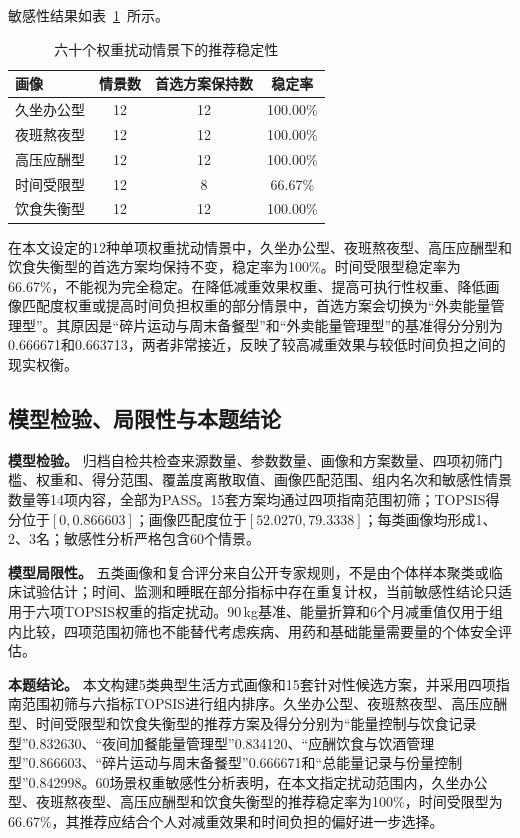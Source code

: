 敏感性结果如表~\ref{tab:q3-sensitivity}~所示。

\begin{table}[htbp]
\centering
\small
\caption{六十个权重扰动情景下的推荐稳定性}
\label{tab:q3-sensitivity}
\begin{tabular}{lccc}
\toprule
画像 & 情景数 & 首选方案保持数 & 稳定率 \\
\midrule
久坐办公型 & 12 & 12 & 100.00\% \\
夜班熬夜型 & 12 & 12 & 100.00\% \\
高压应酬型 & 12 & 12 & 100.00\% \\
时间受限型 & 12 & 8 & 66.67\% \\
饮食失衡型 & 12 & 12 & 100.00\% \\
\bottomrule
\end{tabular}
\end{table}

在本文设定的12种单项权重扰动情景中，久坐办公型、夜班熬夜型、高压应酬型和饮食失衡型的首选方案均保持不变，稳定率为100\%。时间受限型稳定率为66.67\%，不能视为完全稳定。在降低减重效果权重、提高可执行性权重、降低画像匹配度权重或提高时间负担权重的部分情景中，首选方案会切换为“外卖能量管理型”。其原因是“碎片运动与周末备餐型”和“外卖能量管理型”的基准得分分别为0.666671和0.663713，两者非常接近，反映了较高减重效果与较低时间负担之间的现实权衡。

\subsection{模型检验、局限性与本题结论}

\textbf{模型检验。} 归档自检共检查来源数量、参数数量、画像和方案数量、四项初筛门槛、权重和、得分范围、覆盖度离散取值、画像匹配范围、组内名次和敏感性情景数量等14项内容，全部为PASS。15套方案均通过四项指南范围初筛；TOPSIS得分位于$[0,0.866603]$；画像匹配度位于$[52.0270,79.3338]$；每类画像均形成1、2、3名；敏感性分析严格包含60个情景。

\textbf{模型局限性。} 五类画像和复合评分来自公开专家规则，不是由个体样本聚类或临床试验估计；时间、监测和睡眠在部分指标中存在重复计权，当前敏感性结论只适用于六项TOPSIS权重的指定扰动。90\,kg基准、能量折算和6个月减重值仅用于组内比较，四项范围初筛也不能替代考虑疾病、用药和基础能量需要量的个体安全评估。

\textbf{本题结论。} 本文构建5类典型生活方式画像和15套针对性候选方案，并采用四项指南范围初筛与六指标TOPSIS进行组内排序。久坐办公型、夜班熬夜型、高压应酬型、时间受限型和饮食失衡型的推荐方案及得分分别为“能量控制与饮食记录型”0.832630、“夜间加餐能量管理型”0.834120、“应酬饮食与饮酒管理型”0.866603、“碎片运动与周末备餐型”0.666671和“总能量记录与份量控制型”0.842998。60场景权重敏感性分析表明，在本文指定扰动范围内，久坐办公型、夜班熬夜型、高压应酬型和饮食失衡型的推荐稳定率为100\%，时间受限型为66.67\%，其推荐应结合个人对减重效果和时间负担的偏好进一步选择。
